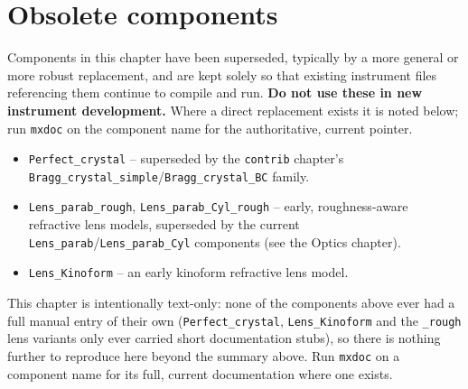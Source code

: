 
\chapter{Obsolete components}
\label{c:obsolete}

Components in this chapter have been superseded, typically by a more
general or more robust replacement, and are kept solely so that existing
instrument files referencing them continue to compile and run. \textbf{Do
not use these in new instrument development.} Where a direct replacement
exists it is noted below; run \verb+mxdoc+ on the component name for the
authoritative, current pointer.

\begin{itemize}
\item \texttt{Perfect\_crystal} -- superseded by the \texttt{contrib} chapter's
  \texttt{Bragg\_crystal\_simple}/\texttt{Bragg\_crystal\_BC} family.
\item \texttt{Lens\_parab\_rough}, \texttt{Lens\_parab\_Cyl\_rough} -- early,
  roughness-aware refractive lens models, superseded by the current
  \texttt{Lens\_parab}/\texttt{Lens\_parab\_Cyl} components (see the Optics
  chapter).
\item \texttt{Lens\_Kinoform} -- an early kinoform refractive lens model.
\end{itemize}

This chapter is intentionally text-only: none of the components above ever had
a full manual entry of their own (\texttt{Perfect\_crystal}, \texttt{Lens\_Kinoform}
and the \texttt{\_rough} lens variants only ever carried short documentation
stubs), so there is nothing further to reproduce here beyond the summary
above. Run \verb+mxdoc+ on a component name for its full, current
documentation where one exists.
